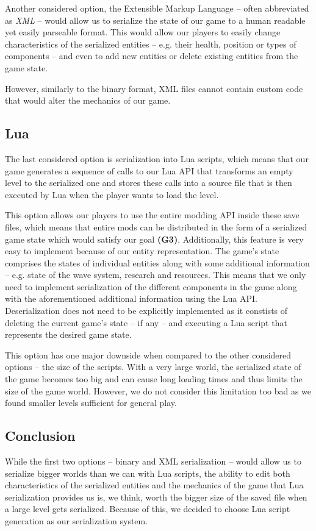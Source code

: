 Another considered option, the Extensible Markup Language -- often abbreviated as \emph{XML} -- would allow us to serialize the
state of our game to a human readable yet easily parseable format. This would allow our players to easily change characteristics of the
serialized entities -- e.g. their health, position or types of components -- and even to add new entities or delete existing entities
from the game state.

However, similarly to the binary format, XML files cannot contain custom code that would alter the mechanics of our game.

\subsection{Lua}

The last considered option is serialization into Lua scripts, which means that our game generates a sequence of calls to our Lua
API that transforms an empty level to the serialized one and stores these calls into a source file that is then executed by Lua when
the player wants to load the level.

This option allows our players to use the entire modding API inside these save files, which means that
entire mods can be distributed in the form of a serialized game state which would satisfy our goal \textbf{(G3)}.
Additionally, this feature is very easy to implement because of our
entity representation. The game's state comprises the states of individual entities along with some additional information -- e.g.
state of the wave system, research and resources. This means that we only need to implement serialization of the different
components in the game along with the aforementioned additional information using the Lua API. Deserialization does not need to be explicitly
implemented as it constists of deleting the current game's state -- if any -- and executing a Lua script that represents the desired
game state.

This option has one major downside when compared to the other considered options -- the size of the scripts. With a very large world,
the serialized state of the game becomes too big and can cause long loading times and thus limits the size of the game world.
However, we do not consider this limitation too bad as we found smaller levels sufficient for general play.

\subsection{Conclusion}

While the first two options -- binary and XML serialization -- would allow us to serialize bigger worlds than we can with Lua scripts,
the ability to edit both characteristics of the serialized entities and the mechanics of the game that Lua serialization provides us
is, we think, worth the bigger size of the saved file when a large level gets serialized. Because of this, we decided to choose Lua script
generation as our serialization system.
